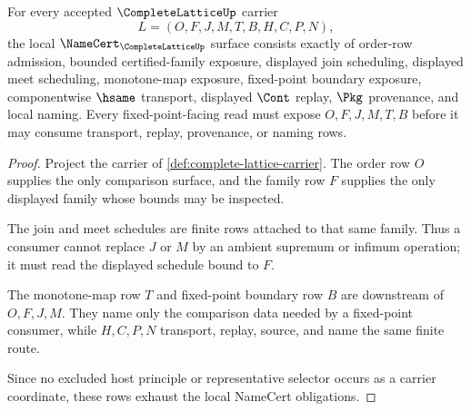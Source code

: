\begin{theorem}
\label{thm:complete-lattice-namecert-obligations}
For every accepted $\CompleteLatticeUp$ carrier
$$
L=(O,F,J,M,T,B,H,C,P,N),
$$
the local $\NameCert_{\CompleteLatticeUp}$ surface consists exactly of order-row admission, bounded certified-family exposure, displayed join scheduling, displayed meet scheduling, monotone-map exposure, fixed-point boundary exposure, componentwise $\hsame$ transport, displayed $\Cont$ replay, $\Pkg$ provenance, and local naming. Every fixed-point-facing read must expose $O,F,J,M,T,B$ before it may consume transport, replay, provenance, or naming rows.
\end{theorem}
\begin{proof}
Project the carrier of \autoref{def:complete-lattice-carrier}. The order row $O$ supplies the only comparison surface, and the family row $F$ supplies the only displayed family whose bounds may be inspected.

The join and meet schedules are finite rows attached to that same family. Thus a consumer cannot replace $J$ or $M$ by an ambient supremum or infimum operation; it must read the displayed schedule bound to $F$.

The monotone-map row $T$ and fixed-point boundary row $B$ are downstream of $O,F,J,M$. They name only the comparison data needed by a fixed-point consumer, while $H,C,P,N$ transport, replay, source, and name the same finite route.

Since no excluded host principle or representative selector occurs as a carrier coordinate, these rows exhaust the local NameCert obligations.
\end{proof}

